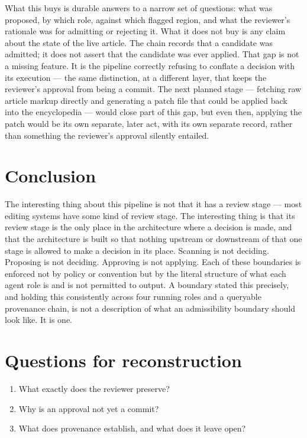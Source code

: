 \documentclass[11pt,openany]{book}
\begin{document}
What this buys is durable answers to a narrow set of questions: what was proposed, by which role, against which flagged region, and what the reviewer's rationale was for admitting or rejecting it. What it does not buy is any claim about the state of the live article. The chain records that a candidate was admitted; it does not assert that the candidate was ever applied. That gap is not a missing feature. It is the pipeline correctly refusing to conflate a decision with its execution — the same distinction, at a different layer, that keeps the reviewer's approval from being a commit. The next planned stage — fetching raw article markup directly and generating a patch file that could be applied back into the encyclopedia — would close part of this gap, but even then, applying the patch would be its own separate, later act, with its own separate record, rather than something the reviewer's approval silently entailed.

\section{Conclusion}

The interesting thing about this pipeline is not that it has a review stage — most editing systems have some kind of review stage. The interesting thing is that its review stage is the only place in the architecture where a decision is made, and that the architecture is built so that nothing upstream or downstream of that one stage is allowed to make a decision in its place. Scanning is not deciding. Proposing is not deciding. Approving is not applying. Each of these boundaries is enforced not by policy or convention but by the literal structure of what each agent role is and is not permitted to output. A boundary stated this precisely, and holding this consistently across four running roles and a queryable provenance chain, is not a description of what an admissibility boundary should look like. It is one.

\section*{Questions for reconstruction}

\begin{enumerate}

\item What exactly does the reviewer preserve?

\item Why is an approval not yet a commit?

\item What does provenance establish, and what does it leave open?

\end{enumerate}
\end{document}
